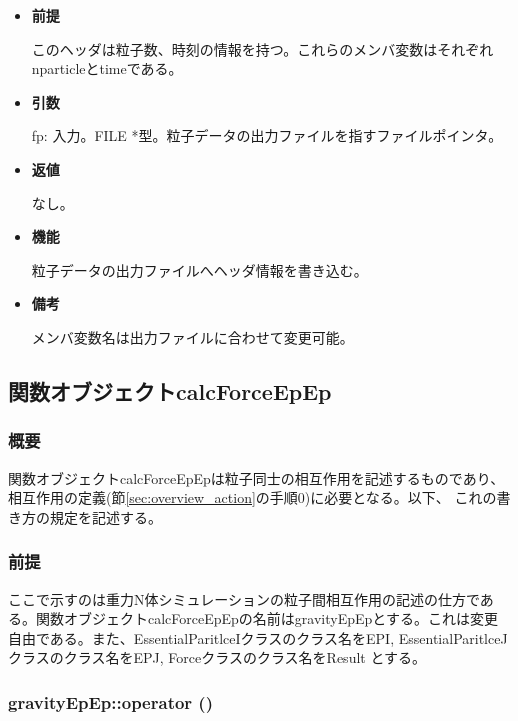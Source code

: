 \begin{itemize}

\item {\bf 前提}

  このヘッダは粒子数、時刻の情報を持つ。これらのメンバ変数はそれぞれ
  nparticleとtimeである。

\item {\bf 引数}

  fp: 入力。FILE *型。粒子データの出力ファイルを指すファイルポインタ。
  
\item {\bf 返値}

  なし。
  
\item {\bf 機能}

  粒子データの出力ファイルへヘッダ情報を書き込む。
  
\item {\bf 備考}

  メンバ変数名は出力ファイルに合わせて変更可能。
  
\end{itemize}


\subsection{関数オブジェクトcalcForceEpEp}
\label{sec:example_userdefined_calcForceEpEp}

\subsubsection{概要}

関数オブジェクトcalcForceEpEpは粒子同士の相互作用を記述するものであり、
相互作用の定義(節\ref{sec:overview_action}の手順0)に必要となる。以下、
これの書き方の規定を記述する。

\subsubsection{前提}

ここで示すのは重力N体シミュレーションの粒子間相互作用の記述の仕方であ
る。関数オブジェクトcalcForceEpEpの名前はgravityEpEpとする。これは変更
自由である。また、EssentialParitlceIクラスのクラス名をEPI,
EssentialParitlceJクラスのクラス名をEPJ, Forceクラスのクラス名をResult
とする。

\subsubsection{gravityEpEp::operator ()}

